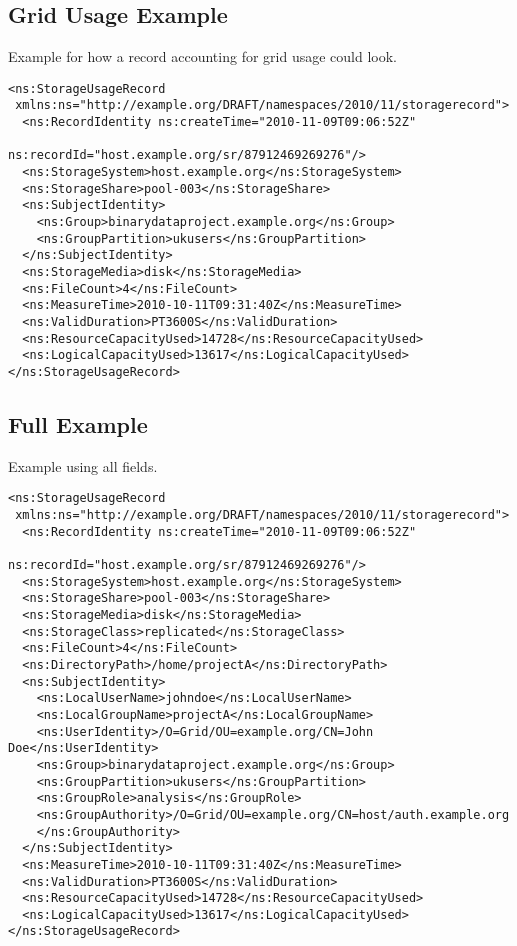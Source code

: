 \subsection{Grid Usage Example}
Example for how a record accounting for grid usage could look.
\begin{verbatim}
<ns:StorageUsageRecord
 xmlns:ns="http://example.org/DRAFT/namespaces/2010/11/storagerecord">
  <ns:RecordIdentity ns:createTime="2010-11-09T09:06:52Z"
                     ns:recordId="host.example.org/sr/87912469269276"/>
  <ns:StorageSystem>host.example.org</ns:StorageSystem>
  <ns:StorageShare>pool-003</ns:StorageShare>
  <ns:SubjectIdentity>
    <ns:Group>binarydataproject.example.org</ns:Group>
    <ns:GroupPartition>ukusers</ns:GroupPartition>
  </ns:SubjectIdentity>
  <ns:StorageMedia>disk</ns:StorageMedia>
  <ns:FileCount>4</ns:FileCount>
  <ns:MeasureTime>2010-10-11T09:31:40Z</ns:MeasureTime>
  <ns:ValidDuration>PT3600S</ns:ValidDuration>
  <ns:ResourceCapacityUsed>14728</ns:ResourceCapacityUsed>
  <ns:LogicalCapacityUsed>13617</ns:LogicalCapacityUsed>
</ns:StorageUsageRecord>
\end{verbatim}

\subsection{Full Example}

Example using all fields.
\begin{verbatim}
<ns:StorageUsageRecord
 xmlns:ns="http://example.org/DRAFT/namespaces/2010/11/storagerecord">
  <ns:RecordIdentity ns:createTime="2010-11-09T09:06:52Z"
                     ns:recordId="host.example.org/sr/87912469269276"/>
  <ns:StorageSystem>host.example.org</ns:StorageSystem>
  <ns:StorageShare>pool-003</ns:StorageShare>
  <ns:StorageMedia>disk</ns:StorageMedia>
  <ns:StorageClass>replicated</ns:StorageClass>
  <ns:FileCount>4</ns:FileCount>
  <ns:DirectoryPath>/home/projectA</ns:DirectoryPath>
  <ns:SubjectIdentity>
    <ns:LocalUserName>johndoe</ns:LocalUserName>
    <ns:LocalGroupName>projectA</ns:LocalGroupName>
    <ns:UserIdentity>/O=Grid/OU=example.org/CN=John Doe</ns:UserIdentity>
    <ns:Group>binarydataproject.example.org</ns:Group>
    <ns:GroupPartition>ukusers</ns:GroupPartition>
    <ns:GroupRole>analysis</ns:GroupRole>
    <ns:GroupAuthority>/O=Grid/OU=example.org/CN=host/auth.example.org
    </ns:GroupAuthority>
  </ns:SubjectIdentity>
  <ns:MeasureTime>2010-10-11T09:31:40Z</ns:MeasureTime>
  <ns:ValidDuration>PT3600S</ns:ValidDuration>
  <ns:ResourceCapacityUsed>14728</ns:ResourceCapacityUsed>
  <ns:LogicalCapacityUsed>13617</ns:LogicalCapacityUsed>
</ns:StorageUsageRecord>
\end{verbatim}
